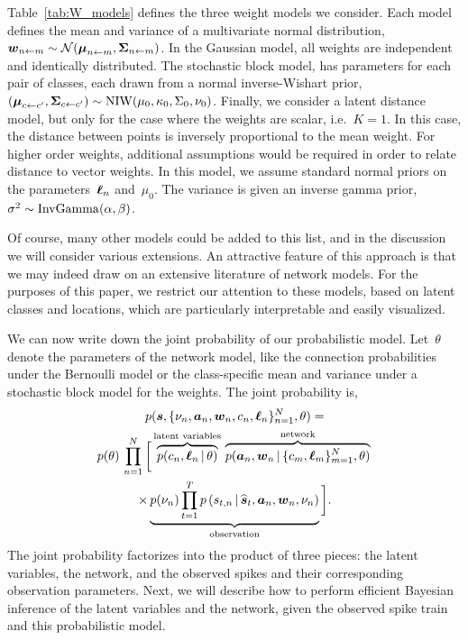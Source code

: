 Table~\ref{tab:W_models} defines the three weight models we
consider.  Each model defines the mean and variance of a multivariate
normal distribution,~$\boldsymbol{w}_{n \leftarrow m} \sim \mathcal{N}(\boldsymbol{\mu}_{n \leftarrow
  m}, \boldsymbol{\Sigma}_{n \leftarrow m})$.  In the Gaussian model, all weights are
independent and identically distributed.  The stochastic block model,
has parameters for each pair of classes, each drawn from a normal
inverse-Wishart prior,~$(\boldsymbol{\mu}_{c \leftarrow c'}, \boldsymbol{\Sigma}_{c \leftarrow c'}) \sim
\mathrm{NIW}(\mu_0, \kappa_0, \Sigma_0, \nu_0)$. Finally, we
consider a latent distance model, but only for the case where the
weights are scalar, i.e.~$K=1$. In this case, the distance between
points is inversely proportional to the mean weight.  For higher order
weights, additional assumptions would be required in order to relate
distance to vector weights. In this model, we assume standard normal
priors on the parameters~$\boldsymbol{\ell}_n$ and~$\mu_0$.  The variance is given
an inverse gamma prior,~$\sigma^2 \sim \mathrm{InvGamma}(\alpha, \beta)$.

Of course, many other models could be added to this list, and in the
discussion we will consider various extensions. An attractive feature
of this approach is that we may indeed draw on an extensive literature
of network models. For the purposes of this paper, we restrict our
attention to these models, based on latent classes and locations,
which are particularly interpretable and easily visualized.

We can now write down the joint probability of our probabilistic model.
Let~$\theta$ denote the parameters of the network model, like the connection
probabilities under the Bernoulli model or the class-specific mean and variance
under a stochastic block model for the weights. 
The joint probability is,
\begin{multline}
p(\boldsymbol{s}, \{\nu_n, \boldsymbol{a}_n, \boldsymbol{w}_n, c_n, \boldsymbol{\ell}_n\}_{n=1}^N, \theta) 
=  \\
p(\theta) \,
\prod_{n=1}^N \bigg[ \overbrace{p(c_n, \boldsymbol{\ell}_n \,|\, \theta)}^\text{latent variables} \, 
\overbrace{p(\boldsymbol{a}_n, \boldsymbol{w}_n \,|\, \{c_m, \boldsymbol{\ell}_m\}_{m=1}^N, \theta)}^\text{network} \, \\
\times \underbrace{ p(\nu_n) \prod_{t=1}^T  p \left(s_{t,n} \,|\, \widehat{\boldsymbol{s}}_{t}, \boldsymbol{a}_n, \boldsymbol{w}_n, \nu_n \right) }_\text{observation} \bigg].
\end{multline}
The joint probability
factorizes into the product of three pieces: the latent variables, the network, and the observed spikes and their corresponding observation parameters. Next, we will describe
how to perform efficient Bayesian inference of the latent variables
and the network, given the observed spike train and this probabilistic model.

